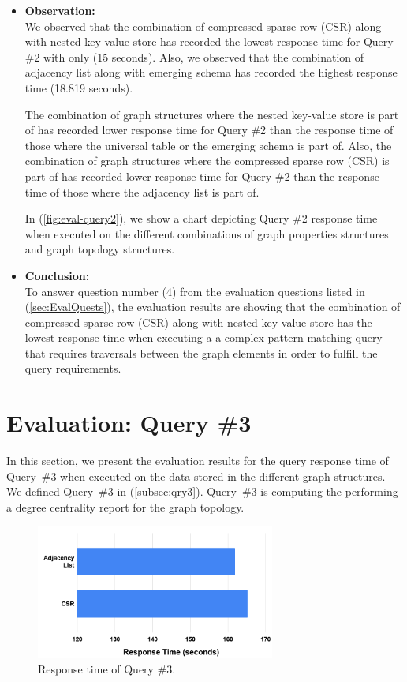 {\begin{itemize}
\item \textbf{Observation:}\\
We observed that the combination of compressed sparse row (CSR) along with nested key-value store has recorded the lowest response time for Query \#2 with only (15 seconds). Also, we observed that the combination of adjacency list along with emerging schema has recorded the highest response time (18.819 seconds). 

The combination of graph structures where the nested key-value store is part of has recorded lower response time for Query \#2 than the response time of those where the universal table or the emerging schema is part of. Also, the combination of graph structures where the compressed sparse row (CSR) is part of has recorded lower response time for Query \#2 than the response time of those where the adjacency list is part of. 

In (\ref{fig:eval-query2}), we show a chart depicting Query \#2 response time when executed on the different combinations of graph properties structures and graph topology structures.

\item \textbf{Conclusion:}\\
To answer question number (4) from the evaluation questions listed in (\ref{sec:EvalQuests}), the evaluation results are showing that the combination of compressed sparse row (CSR) along with nested key-value store has the lowest response time when executing a a complex pattern-matching query that requires traversals between the graph elements in order to fulfill the query requirements.

\end{itemize}

\section{Evaluation: Query \#3}
\label{sec:eval-qry3}

In this section, we present the evaluation results for the query response time of \mbox{Query \#3} when executed on the data stored in the different graph structures. We defined \mbox{Query \#3} in (\ref{subsec:qry3}). \mbox{Query \#3} is computing the performing a degree centrality report for the graph topology.
\begin{figure}[H]
\centering
\includegraphics[width=0.7\textwidth]{pics/Query3-Eval.png}
\caption{Response time of Query \#3.}
\label{fig:eval-query3}
\end{figure} 

}
